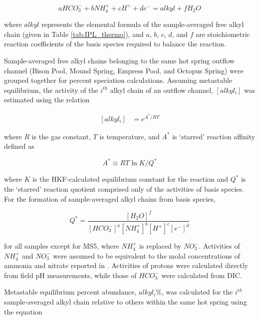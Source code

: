 \begin{equation}
    aHCO_{3}^{-} + bNH_{4}^{+} + cH^{+} + de^{-} = alkyl + fH_{2}O
\end{equation}

\noindent where $alkyl$ represents the elemental formula of the sample-averaged free alkyl chain (given in Table \ref{tab:IPL_thermo}), and $a$, $b$, $c$, $d$, and $f$ are stoichiometric reaction coefficients of the basis species required to balance the reaction.

Sample-averaged free alkyl chains belonging to the same hot spring outflow channel (Bison Pool, Mound Spring, Empress Pool, and Octopus Spring) were grouped together for percent speciation calculations. Assuming metastable equilibrium, the activity of the $i^{th}$ alkyl chain of an outflow channel, $[alkyl_{i}]$ was estimated using the relation

\begin{equation} \label{eq:alkyl_activity}
\begin{split}
[alkyl_{i}] & = e^{A^{*}/RT}
\end{split}
\end{equation}

\noindent where $R$ is the gas constant, $T$ is temperature, and $A^{*}$ is `starred' reaction affinity defined as

\begin{equation}
A^{*} \equiv RT\ln{K/Q^{*}}
\end{equation}

\noindent where $K$ is the HKF-calculated equilibrium constant for the reaction and $Q^{*}$ is the `starred' reaction quotient comprised only of the activities of basis species. For the formation of sample-averaged alkyl chains from basis species,

\begin{equation}
Q^{*} = \frac{[H_{2}O]^{f}}{[HCO_{3}^{-}]^{a}[NH_{4}^{+}]^{b}[H^{+}]^{c}[e^{-}]^{d}}
\end{equation}

\noindent for all samples except for MS5, where $NH_{4}^{+}$ is replaced by $NO_{3}^{-}$. Activities of $NH_{4}^{+}$ and $NO_{3}^{-}$ were assumed to be equivalent to the molal concentrations of ammonia and nitrate reported in \cite{boyer2018thermophile}. Activities of protons were calculated directly from field pH measurements, while those of $HCO_{3}^{-}$ were calculated from DIC.

Metastable equilibrium percent abundance, $alkyl_{i}\%$, was calculated for the $i^{th}$ sample-averaged alkyl chain relative to others within the same hot spring using the equation

